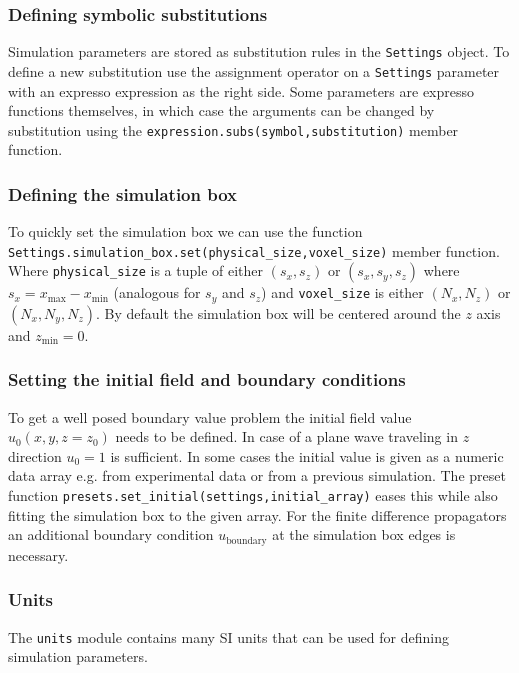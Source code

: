 \subsubsection{Defining symbolic substitutions}

Simulation parameters are stored as substitution rules in the \lstinline{Settings} object. To define a new substitution use the assignment operator on a \lstinline{Settings} parameter with an expresso expression as the right side. Some parameters are expresso functions themselves, in which case the arguments can be changed by substitution using the \lstinline{expression.subs(symbol,substitution)} member function.

\subsubsection{Defining the simulation box}

To quickly set the simulation box we can use the function \lstinline{Settings.simulation_box.set(physical_size,voxel_size)} member function. Where \lstinline{physical_size} is a tuple of either $(s_x,s_z)$ or $(s_x,s_y,s_z)$ where $s_x = x_\text{max} - x_\text{min}$ (analogous for $s_y$ and $s_z$) and \lstinline{voxel_size} is either $(N_x,N_z)$ or $(N_x,N_y,N_z)$. By default the simulation box will be centered around the $z$ axis and $z_\text{min} = 0$.

\subsubsection{Setting the initial field and boundary conditions}

To get a well posed boundary value problem the initial field value $u_0(x,y,z = z_0)$ needs to be defined. In case of a plane wave traveling in $z$ direction $u_0 = 1$ is sufficient. In some cases the initial value is given as a numeric data array e.g. from experimental data or from a previous simulation. The preset function \lstinline{presets.set_initial(settings,initial_array)} eases this while also fitting the simulation box to the given array. For the finite difference propagators an additional boundary condition $u_\text{boundary}$ at the simulation box edges is necessary.

\subsubsection{Units}

The \lstinline{units} module contains many SI units that can be used for defining simulation parameters.

